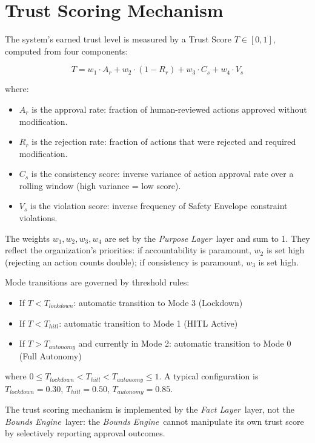\documentclass[12pt]{article}
\newcommand{\purpose}{\textit{Purpose Layer}}
\newcommand{\bounds}{\textit{Bounds Engine}}
\newcommand{\fact}{\textit{Fact Layer}}
\begin{document}
\section{Trust Scoring Mechanism}
\label{sec:trust}

The system's earned trust level is measured by a Trust Score $T \in [0, 1]$, computed from four components:

$$T = w_1 \cdot A_r + w_2 \cdot (1 - R_r) + w_3 \cdot C_s + w_4 \cdot V_s$$

where:

\begin{itemize}[noitemsep]
    \item $A_r$ is the approval rate: fraction of human-reviewed actions approved without modification.
    \item $R_r$ is the rejection rate: fraction of actions that were rejected and required modification.
    \item $C_s$ is the consistency score: inverse variance of action approval rate over a rolling window (high variance = low score).
    \item $V_s$ is the violation score: inverse frequency of Safety Envelope constraint violations.
\end{itemize}

The weights $w_1, w_2, w_3, w_4$ are set by the \purpose\ layer and sum to 1. They reflect the organization's priorities: if accountability is paramount, $w_2$ is set high (rejecting an action counts double); if consistency is paramount, $w_3$ is set high.

Mode transitions are governed by threshold rules:

\begin{itemize}[noitemsep]
    \item If $T < T_{lockdown}$: automatic transition to Mode 3 (Lockdown)
    \item If $T < T_{hitl}$: automatic transition to Mode 1 (HITL Active)
    \item If $T > T_{autonomy}$ and currently in Mode 2: automatic transition to Mode 0 (Full Autonomy)
\end{itemize}

where $0 \leq T_{lockdown} < T_{hitl} < T_{autonomy} \leq 1$. A typical configuration is $T_{lockdown} = 0.30$, $T_{hitl} = 0.50$, $T_{autonomy} = 0.85$.

The trust scoring mechanism is implemented by the \fact\ layer, not the \bounds\ layer: the \bounds\ cannot manipulate its own trust score by selectively reporting approval outcomes.
\end{document}
